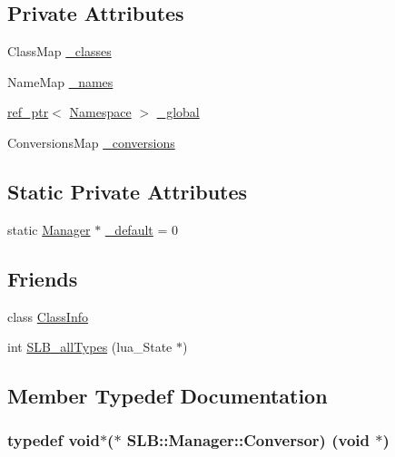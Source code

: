 \subsection*{Private Attributes}
\begin{DoxyCompactItemize}
\item 
Class\+Map \hyperlink{classSLB_1_1Manager_a745bd55a40147abf8ec45a116227dd4e}{\+\_\+classes}
\item 
Name\+Map \hyperlink{classSLB_1_1Manager_a962ea3cb7cef0e36dd972b0b47a89a38}{\+\_\+names}
\item 
\hyperlink{classSLB_1_1ref__ptr}{ref\+\_\+ptr}$<$ \hyperlink{classSLB_1_1Namespace}{Namespace} $>$ \hyperlink{classSLB_1_1Manager_add907d0eb61812e0bf152ab4d9d3d8f9}{\+\_\+global}
\item 
Conversions\+Map \hyperlink{classSLB_1_1Manager_a258002e47f95d95ad3fe090cca586132}{\+\_\+conversions}
\end{DoxyCompactItemize}
\subsection*{Static Private Attributes}
\begin{DoxyCompactItemize}
\item 
static \hyperlink{classSLB_1_1Manager}{Manager} $\ast$ \hyperlink{classSLB_1_1Manager_a2c7ab0191389115abf8ffcf2c1dd3390}{\+\_\+default} = 0
\end{DoxyCompactItemize}
\subsection*{Friends}
\begin{DoxyCompactItemize}
\item 
class \hyperlink{classSLB_1_1Manager_ae6eaadf7953b7fe283a68d411b7b65b7}{Class\+Info}
\item 
int \hyperlink{classSLB_1_1Manager_a1178a0abf9c1d944d10b46903a938a07}{S\+L\+B\+\_\+all\+Types} (lua\+\_\+\+State $\ast$)
\end{DoxyCompactItemize}


\subsection{Member Typedef Documentation}
\subsubsection[{\texorpdfstring{Conversor}{Conversor}}]{\setlength{\rightskip}{0pt plus 5cm}typedef void$\ast$($\ast$ S\+L\+B\+::\+Manager\+::\+Conversor) (void $\ast$)}\hypertarget{classSLB_1_1Manager_ace7ae7e8febfd03b7a43ac5b24dabdff}{}\label{classSLB_1_1Manager_ace7ae7e8febfd03b7a43ac5b24dabdff}
